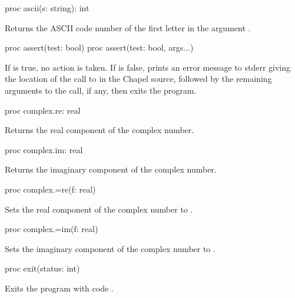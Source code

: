 \begin{protohead}
proc ascii(s: string): int
\end{protohead}
\begin{protobody}
Returns the ASCII code number of the first letter in the
argument .
\end{protobody}

\begin{protohead}
proc assert(test: bool)
proc assert(test: bool, args...)
\end{protohead}
\begin{protobody}
If  is true, no action is taken.
If  is false,
prints an error message to stderr giving the location of the call to 
in the Chapel source, followed by the remaining arguments to the call, if any,
then exits the program.
\end{protobody}

\begin{protohead}
proc complex.re: real
\end{protohead}
\begin{protobody}
Returns the real component of the complex number.
\end{protobody}

\begin{protohead}
proc complex.im: real
\end{protohead}
\begin{protobody}
Returns the imaginary component of the complex number.
\end{protobody}

\begin{protohead}
proc complex.=re(f: real)
\end{protohead}
\begin{protobody}
Sets the real component of the complex number to .
\end{protobody}

\begin{protohead}
proc complex.=im(f: real)
\end{protohead}
\begin{protobody}
Sets the imaginary component of the complex number to .
\end{protobody}

\begin{protohead}
proc exit(status: int)
\end{protohead}
\begin{protobody}
Exits the program with code .
\end{protobody}


